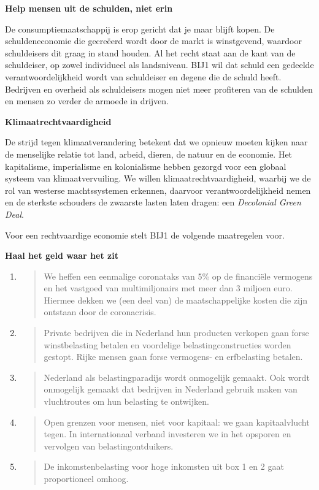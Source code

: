 \textbf{Help mensen uit de schulden, niet erin}

De consumptiemaatschappij is erop gericht dat je maar blijft kopen. De
schuldeneconomie die gecreëerd wordt door de markt is winstgevend,
waardoor schuldeisers dit graag in stand houden. Al het recht staat aan
de kant van de schuldeiser, op zowel individueel als landsniveau. BIJ1
wil dat schuld een gedeelde verantwoordelijkheid wordt van schuldeiser
en degene die de schuld heeft. Bedrijven en overheid als schuldeisers
mogen niet meer profiteren van de schulden en mensen zo verder de
armoede in drijven.

\textbf{Klimaatrechtvaardigheid}

De strijd tegen klimaatverandering betekent dat we opnieuw moeten kijken
naar de menselijke relatie tot land, arbeid, dieren, de natuur en de
economie. Het kapitalisme, imperialisme en kolonialisme hebben gezorgd
voor een globaal systeem van klimaatvervuiling. We willen
klimaatrechtvaardigheid, waarbij we de rol van westerse machtssystemen
erkennen, daarvoor verantwoordelijkheid nemen en de sterkste schouders
de zwaarste lasten laten dragen: een \emph{Decolonial Green Deal}.

Voor een rechtvaardige economie stelt BIJ1 de volgende maatregelen voor.

\textbf{Haal het geld waar het zit}

\begin{enumerate}
\def\labelenumi{\arabic{enumi}.}
\item
  \begin{quote}
  We heffen een eenmalige coronataks van 5\% op de financiële vermogens
  en het vastgoed van multimiljonairs met meer dan 3 miljoen euro.
  Hiermee dekken we (een deel van) de maatschappelijke kosten die zijn
  ontstaan door de coronacrisis.
  \end{quote}
\item
  \begin{quote}
  Private bedrijven die in Nederland hun producten verkopen gaan forse
  winstbelasting betalen en voordelige belastingconstructies worden
  gestopt. Rijke mensen gaan forse vermogens- en erfbelasting betalen.
  \end{quote}
\item
  \begin{quote}
  Nederland als belastingparadijs wordt onmogelijk gemaakt. Ook wordt
  onmogelijk gemaakt dat bedrijven in Nederland gebruik maken van
  vluchtroutes om hun belasting te ontwijken.
  \end{quote}
\item
  \begin{quote}
  Open grenzen voor mensen, niet voor kapitaal: we gaan kapitaalvlucht
  tegen. In internationaal verband investeren we in het opsporen en
  vervolgen van belastingontduikers.
  \end{quote}
\item
  \begin{quote}
  De inkomstenbelasting voor hoge inkomsten uit box 1 en 2 gaat
  proportioneel omhoog.
  \end{quote}
\end{enumerate}

